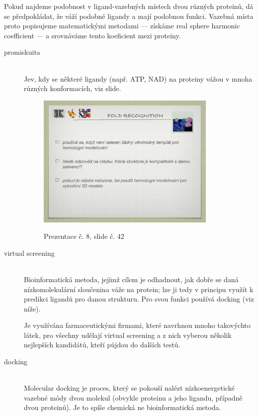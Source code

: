 \documentclass[DIV=8]{scrreprt}
\begin{document}
Pokud najdeme podobnost v ligand-vazebných místech dvou různých proteinů, dá se předpokládat, že váží podobné ligandy a mají podobnou funkci. Vazebná místa proto popisujeme matematickými metodami --- získáme real sphere harmonic coefficient --- a srovnáváme tento koeficient mezi proteiny.

\begin{description}
\item[promiskuita]\hfill \\
Jev, kdy se některé ligandy (např. ATP, NAD) na proteiny vážou v mnoha různých konformacích, viz slide. \begin{figure}
    \caption{Prezentace č. 8, slide č. 42}
    \includegraphics[width=0.85\textwidth]{slides-8/slide-42.jpg}
    \centering
    \label{slides-8-slide-42}
\end{figure}



\item[virtual screening]\hfill \\
Bioinformatická metoda, jejímž cílem je odhadnout, jak dobře se daná nízkomolekulární sloučenina váže na protein; lze ji tedy v principu využít k predikci ligandů pro danou strukturu. Pro svou funkci používá docking (viz níže).

Je využívána farmaceutickými firmami, které navrhnou mnoho takovýchto látek, pro všechny udělají virtual screening a z nich vyberou několik nejlepších kandidátů, kteří půjdou do dalších testů.


\item[docking]\hfill \\
Molecular docking je proces, který se pokouší nalézt nízkoenergetické vazebné módy dvou molekul (obvykle proteinu a jeho ligandu, případně dvou proteinů). Je to spíše chemická ne bioinformatická metoda.

\end{description}
\end{document}

